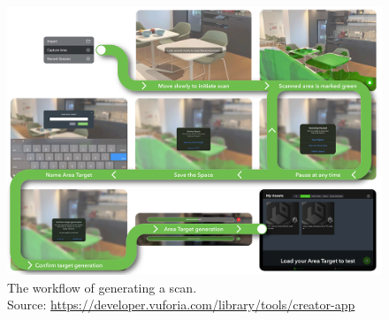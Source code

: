 \begin{figure}[ht]
  \centering
  \includegraphics[scale=1]{content/resources/images/chap-problems-solutions/construct-environment-6.PNG}
  \caption{The workflow of generating a scan. \\ \small{Source: \url{https://developer.vuforia.com/library/tools/creator-app}}}
  \label{fig:construct-environment-6}
\end{figure}
